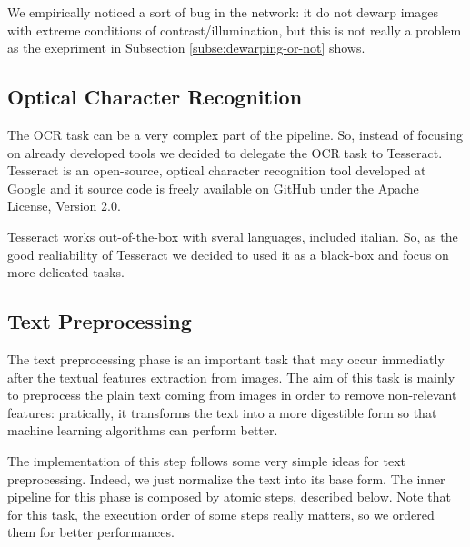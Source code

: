 \documentclass[10pt,twocolumn,letterpaper]{article}
\begin{document}
We empirically noticed a sort of bug in the network: it do not dewarp
images with extreme conditions of contrast/illumination, but this is
not really a problem as the exepriment in Subsection
\ref{subse:dewarping-or-not} shows.

\subsection{Optical Character Recognition}

The OCR task can be a very complex part of the pipeline. So, instead
of focusing on already developed tools we decided to delegate the OCR
task to Tesseract. Tesseract is an open-source, optical character
recognition tool developed at Google and it source code is freely
available on GitHub under the Apache License, Version 2.0.

Tesseract works out-of-the-box with sveral languages, included
italian. So, as the good realiability of Tesseract we decided to used
it as a black-box and focus on more delicated tasks.

\subsection{Text Preprocessing}

The text preprocessing phase is an important task that may occur
immediatly after the textual features extraction from images. The aim
of this task is mainly to preprocess the plain text coming from images
in order to remove non-relevant features: pratically, it transforms the
text into a more digestible form so that machine learning algorithms
can perform better.

The implementation of this step follows some very simple ideas for
text preprocessing. Indeed, we just normalize the text into its base
form. The inner pipeline for this phase is composed by atomic steps,
described below. Note that for this task, the execution order of some
steps really matters, so we ordered them for better performances.
\end{document}
